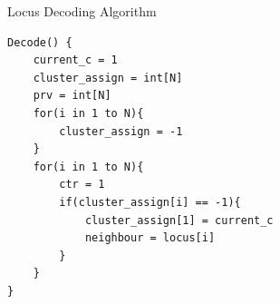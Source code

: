 \begin{table}[b]
\caption{Locus Decoding Algorithm}
\label{algorithmX}
\begin{verbatim}
Decode() {
    current_c = 1
    cluster_assign = int[N]
    prv = int[N]
    for(i in 1 to N){
        cluster_assign = -1
    }
    for(i in 1 to N){
        ctr = 1
        if(cluster_assign[i] == -1){
            cluster_assign[1] = current_c
            neighbour = locus[i]
        }
    }
}
\end{verbatim}
\end{table}

